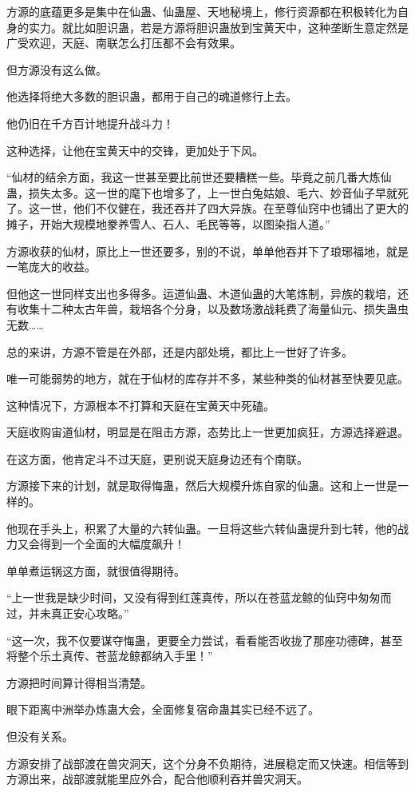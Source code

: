 \begin{this_body}
方源的底蕴更多是集中在仙蛊、仙蛊屋、天地秘境上，修行资源都在积极转化为自身的实力。就比如胆识蛊，若是方源将胆识蛊放到宝黄天中，这种垄断生意定然是广受欢迎，天庭、南联怎么打压都不会有效果。

但方源没有这么做。

他选择将绝大多数的胆识蛊，都用于自己的魂道修行上去。

他仍旧在千方百计地提升战斗力！

这种选择，让他在宝黄天中的交锋，更加处于下风。

“仙材的结余方面，我这一世甚至要比前世还要糟糕一些。毕竟之前几番大炼仙蛊，损失太多。这一世的麾下也增多了，上一世白兔姑娘、毛六、妙音仙子早就死了。这一世，他们不仅健在，我还吞并了四大异族。在至尊仙窍中也铺出了更大的摊子，开始大规模地豢养雪人、石人、毛民等等，以图染指人道。”

方源收获的仙材，原比上一世还要多，别的不说，单单他吞并下了琅琊福地，就是一笔庞大的收益。

但他这一世同样支出也多得多。运道仙蛊、木道仙蛊的大笔炼制，异族的栽培，还有收集十二种太古年兽，栽培各个分身，以及数场激战耗费了海量仙元、损失蛊虫无数……

总的来讲，方源不管是在外部，还是内部处境，都比上一世好了许多。

唯一可能弱势的地方，就在于仙材的库存并不多，某些种类的仙材甚至快要见底。

这种情况下，方源根本不打算和天庭在宝黄天中死磕。

天庭收购宙道仙材，明显是在阻击方源，态势比上一世更加疯狂，方源选择避退。

在这方面，他肯定斗不过天庭，更别说天庭身边还有个南联。

方源接下来的计划，就是取得悔蛊，然后大规模升炼自家的仙蛊。这和上一世是一样的。

他现在手头上，积累了大量的六转仙蛊。一旦将这些六转仙蛊提升到七转，他的战力又会得到一个全面的大幅度飙升！

单单煮运锅这方面，就很值得期待。

“上一世我是缺少时间，又没有得到红莲真传，所以在苍蓝龙鲸的仙窍中匆匆而过，并未真正安心攻略。”

“这一次，我不仅要谋夺悔蛊，更要全力尝试，看看能否收拢了那座功德碑，甚至将整个乐土真传、苍蓝龙鲸都纳入手里！”

方源把时间算计得相当清楚。

眼下距离中洲举办炼蛊大会，全面修复宿命蛊其实已经不远了。

但没有关系。

方源安排了战部渡在兽灾洞天，这个分身不负期待，进展稳定而又快速。相信等到方源出来，战部渡就能里应外合，配合他顺利吞并兽灾洞天。


\end{this_body}
